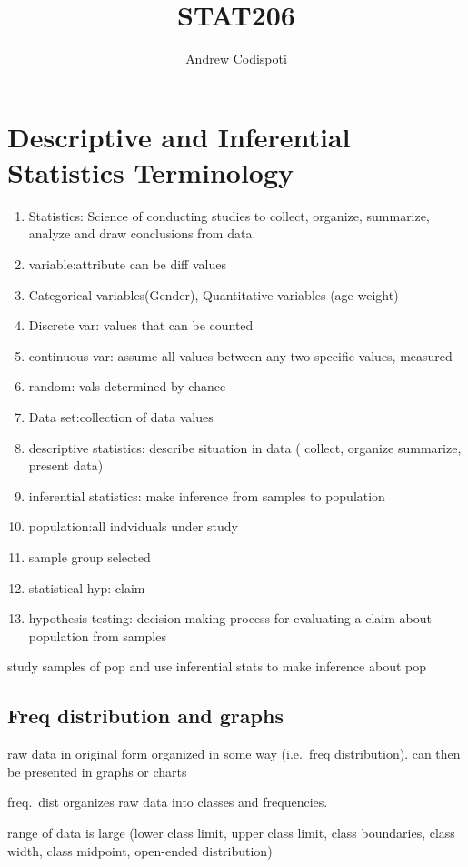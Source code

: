 \documentclass[11pt]{article}
\title{STAT206}
\author{Andrew Codispoti}
\begin{document}
\maketitle
\section{Descriptive and Inferential Statistics Terminology}
\begin{enumerate}
  \item Statistics: Science of conducting studies to collect, organize,
    summarize, analyze and draw conclusions from data.
  \item
    variable:attribute can be diff values
  \item Categorical variables(Gender), Quantitative variables (age weight)
  \item Discrete var: values that can be counted
  \item continuous var: assume all values between any two specific values,
    measured
  \item random: vals determined by chance
  \item Data set:collection of data values
  \item descriptive statistics: describe situation in data ( collect,
    organize summarize, present data)
  \item inferential statistics: make inference from samples to population
  \item population:all indviduals under study
  \item sample group selected
  \item statistical hyp: claim
  \item hypothesis testing: decision making process for evaluating a
    claim about population from samples
\end{enumerate}
\par study samples of pop and use inferential stats to make inference
about pop
\subsection{Freq distribution and graphs}
\par raw data in original form organized in some way  (i.e.\ freq
distribution). can then be presented in graphs or charts
\par freq.\ dist organizes raw data into classes and frequencies.
\par range of data is large (lower class limit, upper class limit, class
boundaries, class width, class midpoint, open-ended distribution)
\end{document}
